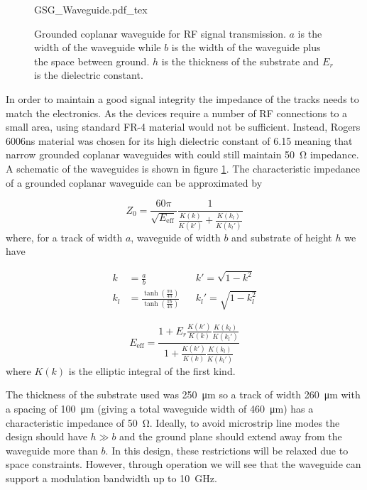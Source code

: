 \begin{figure}[tp]
	\centering
	\Large
	\def\svgwidth{0.6\textwidth} 
	{GSG_Waveguide.pdf_tex}
	\caption[Grounded coplanar waveguide structure]{Grounded coplanar waveguide for RF signal transmission. $a$ is the width of the waveguide while $b$ is the width of the waveguide plus the space between ground. $h$ is the thickness of the substrate and $E_r$ is the dielectric constant.}
	\label{fig:GSG_waveguide}
\end{figure}

In order to maintain a good signal integrity the impedance of the tracks needs to match the electronics. As the devices require a number of RF connections to a small area, using standard FR-4 material would not be sufficient. Instead, Rogers 6006ns material was chosen for its high dielectric constant of \num{6.15} meaning that narrow grounded coplanar waveguides with could still maintain \SI{50}{\ohm} impedance. A schematic of the waveguides is shown in figure \ref{fig:GSG_waveguide}. The characteristic impedance of a grounded coplanar waveguide can be approximated by \cite{wadell1991}

\begin{equation}
	Z_0 = \frac{60\pi}{\sqrt{E_\text{eff}}}\frac{1}{\frac{K(k)}{K(k')} + \frac{K(k_l)}{K(k_l')}}
\end{equation}
where, for a track of width $a$, waveguide of width $b$ and substrate of height $h$ we have

\begin{align}
	k &= \frac{a}{b} &&k' = \sqrt{1 - k^2}\\
	k_l &= \frac{\tanh\left(\frac{\pi a}{4 h}\right)}{\tanh\left(\frac{\pi b}{4 h}\right)} &&k_l' = \sqrt{1 - k_l^2}
\end{align}

\begin{equation}
	E_\text{eff} = \frac{1 + E_r \frac{K(k')}{K(k)} \frac{K(k_l)}{K(k_l')}}{1 + \frac{K(k')}{K(k)} \frac{K(k_l)}{K(k_l')}}
\end{equation}
where $K(k)$ is the elliptic integral of the first kind. 

The thickness of the substrate used was \SI{250}{\um} so a track of width \SI{260}{\um} with a spacing of \SI{100}{\um} (giving a total waveguide width of \SI{460}{\um}) has a characteristic impedance of \SI{50}{\ohm}. Ideally, to avoid microstrip line modes the design should have $h \gg b$ and the ground plane should extend away from the waveguide more than $b$\cite{riaziat1987}. In this design, these restrictions will be relaxed due to space constraints. However, through operation we will see that the waveguide can support a modulation bandwidth up to \SI{10}{GHz}.

